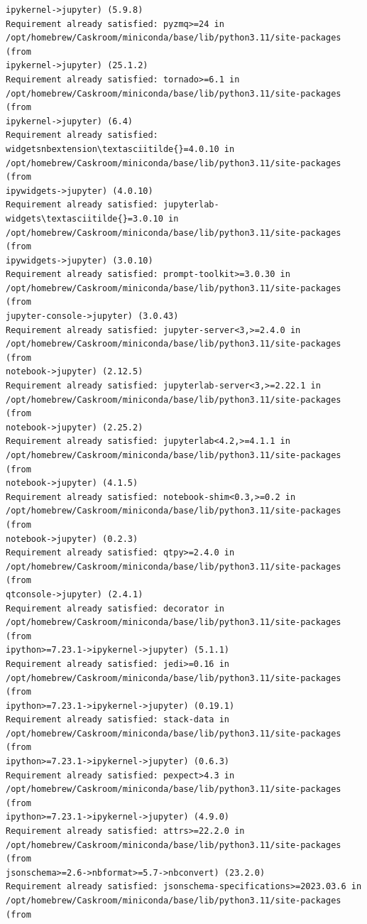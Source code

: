 \documentclass[11pt]{article}
\begin{document}
\begin{Verbatim}[commandchars=\\\{\}]
ipykernel->jupyter) (5.9.8)
Requirement already satisfied: pyzmq>=24 in
/opt/homebrew/Caskroom/miniconda/base/lib/python3.11/site-packages (from
ipykernel->jupyter) (25.1.2)
Requirement already satisfied: tornado>=6.1 in
/opt/homebrew/Caskroom/miniconda/base/lib/python3.11/site-packages (from
ipykernel->jupyter) (6.4)
Requirement already satisfied: widgetsnbextension\textasciitilde{}=4.0.10 in
/opt/homebrew/Caskroom/miniconda/base/lib/python3.11/site-packages (from
ipywidgets->jupyter) (4.0.10)
Requirement already satisfied: jupyterlab-widgets\textasciitilde{}=3.0.10 in
/opt/homebrew/Caskroom/miniconda/base/lib/python3.11/site-packages (from
ipywidgets->jupyter) (3.0.10)
Requirement already satisfied: prompt-toolkit>=3.0.30 in
/opt/homebrew/Caskroom/miniconda/base/lib/python3.11/site-packages (from
jupyter-console->jupyter) (3.0.43)
Requirement already satisfied: jupyter-server<3,>=2.4.0 in
/opt/homebrew/Caskroom/miniconda/base/lib/python3.11/site-packages (from
notebook->jupyter) (2.12.5)
Requirement already satisfied: jupyterlab-server<3,>=2.22.1 in
/opt/homebrew/Caskroom/miniconda/base/lib/python3.11/site-packages (from
notebook->jupyter) (2.25.2)
Requirement already satisfied: jupyterlab<4.2,>=4.1.1 in
/opt/homebrew/Caskroom/miniconda/base/lib/python3.11/site-packages (from
notebook->jupyter) (4.1.5)
Requirement already satisfied: notebook-shim<0.3,>=0.2 in
/opt/homebrew/Caskroom/miniconda/base/lib/python3.11/site-packages (from
notebook->jupyter) (0.2.3)
Requirement already satisfied: qtpy>=2.4.0 in
/opt/homebrew/Caskroom/miniconda/base/lib/python3.11/site-packages (from
qtconsole->jupyter) (2.4.1)
Requirement already satisfied: decorator in
/opt/homebrew/Caskroom/miniconda/base/lib/python3.11/site-packages (from
ipython>=7.23.1->ipykernel->jupyter) (5.1.1)
Requirement already satisfied: jedi>=0.16 in
/opt/homebrew/Caskroom/miniconda/base/lib/python3.11/site-packages (from
ipython>=7.23.1->ipykernel->jupyter) (0.19.1)
Requirement already satisfied: stack-data in
/opt/homebrew/Caskroom/miniconda/base/lib/python3.11/site-packages (from
ipython>=7.23.1->ipykernel->jupyter) (0.6.3)
Requirement already satisfied: pexpect>4.3 in
/opt/homebrew/Caskroom/miniconda/base/lib/python3.11/site-packages (from
ipython>=7.23.1->ipykernel->jupyter) (4.9.0)
Requirement already satisfied: attrs>=22.2.0 in
/opt/homebrew/Caskroom/miniconda/base/lib/python3.11/site-packages (from
jsonschema>=2.6->nbformat>=5.7->nbconvert) (23.2.0)
Requirement already satisfied: jsonschema-specifications>=2023.03.6 in
/opt/homebrew/Caskroom/miniconda/base/lib/python3.11/site-packages (from

\end{Verbatim}
\end{document}
